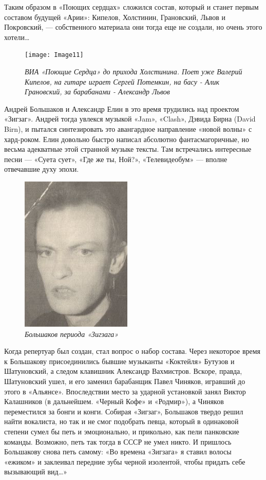 \documentclass[16pt,a5paper,oneside]{book}
\begin{document}
Таким образом в «Поющих сердцах» сложился состав, который и станет первым составом будущей «Арии»: Кипелов, Холстинин,
Грановский, Львов и Покровский, — собственного материала они тогда еще не создали, но очень этого хотели\ldots

\begin{figure}
    \centering
    \texttt{[image: Image11]}
    \caption{\textit{
        ВИА «Поющие Сердца» до прихода Холстинина. Поет уже Валерий Кипелов, на гитаре играет Сергей Потемкин, на басу -
        Алик Грановский, за барабанами - Александр Львов
    }}
\end{figure}

Андрей Большаков и Александр Елин в это время трудились над проектом «Зигзаг». Андрей тогда увлекся музыкой «Jam»,
«Clash», Дэвида Бирна (David Birn), и пытался синтезировать это авангардное направление «новой волны» с хард-роком. Елин
довольно быстро написал абсолютно фантасмагоричные, но весьма адекватные этой странной музыке тексты. Там встречались
интересные песни — «Суета сует», «Где же ты, Ной?», «Телевидеобум» — вполне отвечавшие духу эпохи.

\begin{figure}
    \centering
    \includegraphics[scale=0.9]{Image12}
    \caption{\textit{Большаков периода «Зигзага»}}
\end{figure}

Когда репертуар был создан, стал вопрос о набор состава. Через некоторое время к Большакову присоединились бывшие
музыканты «Коктейля» Бутузов и Шатуновский, а следом клавишник Александр Вахмистров. Вскоре, правда, Шатуновский ушел, и
его заменил барабанщик Павел Чиняков, игравший до этого в «Альянсе». Впоследствии место за ударной установкой занял
Виктор Калашников (в дальнейшем. «Черный Кофе» и «Родмир»), а Чиняков переместился за бонги и конги. Собирая «Зигзаг»,
Большаков твердо решил найти вокалиста, но так и не смог подобрать певца, который в одинаковой степени сумел бы петь и
эмоционально, и прикольно, как пели панковские команды. Возможно, петь так тогда в СССР не умел никто. И пришлось
Большакову снова петь самому: «Во времена «Зигзага» я ставил волосы «ежиком» и заклеивал передние зубы черной изолентой,
чтобы придать себе вызывающий вид\ldots»
\end{document}
